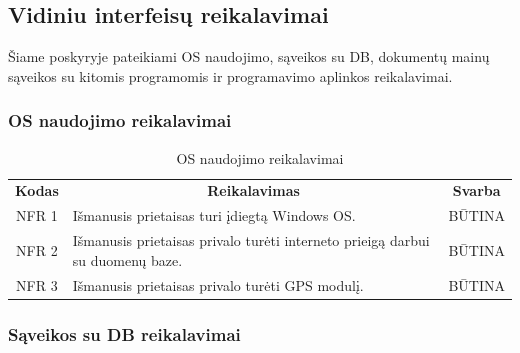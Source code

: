 \documentclass{VUMIFPSkursinis}
\begin{document}
\subsection{Vidiniu interfeisų reikalavimai}
Šiame poskyryje pateikiami OS naudojimo, sąveikos su DB, dokumentų mainų sąveikos su kitomis programomis ir programavimo aplinkos reikalavimai.
\subsubsection{OS naudojimo reikalavimai}

\begin{center}
	\begin{table}[H]
	\caption{OS naudojimo reikalavimai}
	\begin{tabular}{|p{2cm}|p{}|p{}|}
	\hline
	    \rowcolor{lightgray}
		\multicolumn{3}{|c|}{Apsaugos reikalavimai}\\
		
	\hline
		\multicolumn{1}{|c|}{{\bfseries Kodas}}&
		\multicolumn{1}{|c|}{{\bfseries Reikalavimas}}&
		\multicolumn{1}{|c|}{{\bfseries Svarba}}\\
	\hline 	
		\multicolumn{1}{|c|}{NFR 1}&
		{Išmanusis prietaisas turi įdiegtą Windows OS.}&
		\multicolumn{1}{|c|}{BŪTINA}\\	
	
	\hline 	
		\multicolumn{1}{|c|}{NFR 2}&
		{Išmanusis prietaisas privalo turėti interneto prieigą darbui su duomenų baze.}&
		\multicolumn{1}{|c|}{BŪTINA}\\	
	
	\hline 	
		\multicolumn{1}{|c|}{NFR 3}&
		{Išmanusis prietaisas privalo turėti GPS modulį.}&
		\multicolumn{1}{|c|}{BŪTINA}\\	
	
	\hline 	 	
	\end{tabular}
	
	\label{table:OSnaudojimoreikalavimai}
	\end{table}

\end{center}

\subsubsection{Sąveikos su DB reikalavimai}
\end{document}
